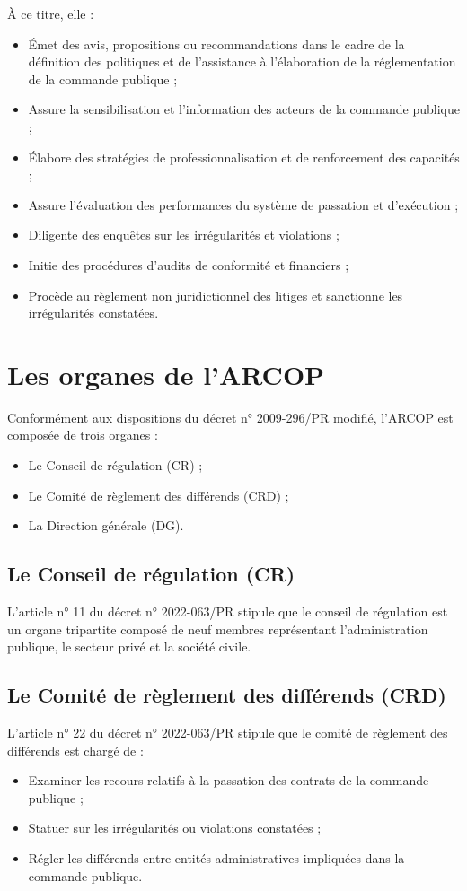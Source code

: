 À ce titre, elle :
\begin{itemize}
    \item Émet des avis, propositions ou recommandations dans le cadre de la définition des politiques et de l'assistance à l'élaboration de la réglementation de la commande publique ;
    \item Assure la sensibilisation et l'information des acteurs de la commande publique ;
    \item Élabore des stratégies de professionnalisation et de renforcement des capacités ;
    \item Assure l’évaluation des performances du système de passation et d’exécution ;
    \item Diligente des enquêtes sur les irrégularités et violations ;
    \item Initie des procédures d'audits de conformité et financiers ;
    \item Procède au règlement non juridictionnel des litiges et sanctionne les irrégularités constatées.
\end{itemize}

\section{Les organes de l’ARCOP}
Conformément aux dispositions du décret n° 2009-296/PR modifié, l’ARCOP est composée de trois organes :
\begin{itemize}
    \item Le Conseil de régulation (CR) ;
    \item Le Comité de règlement des différends (CRD) ;
    \item La Direction générale (DG).
\end{itemize}

\subsection{Le Conseil de régulation (CR)}
L’article n° 11 du décret n° 2022-063/PR stipule que le conseil de régulation est un organe tripartite composé de neuf membres représentant l’administration publique, le secteur privé et la société civile.

\subsection{Le Comité de règlement des différends (CRD)}
L’article n° 22 du décret n° 2022-063/PR stipule que le comité de règlement des différends est chargé de :
\begin{itemize}
    \item Examiner les recours relatifs à la passation des contrats de la commande publique ;
    \item Statuer sur les irrégularités ou violations constatées ;
    \item Régler les différends entre entités administratives impliquées dans la commande publique.
\end{itemize}

